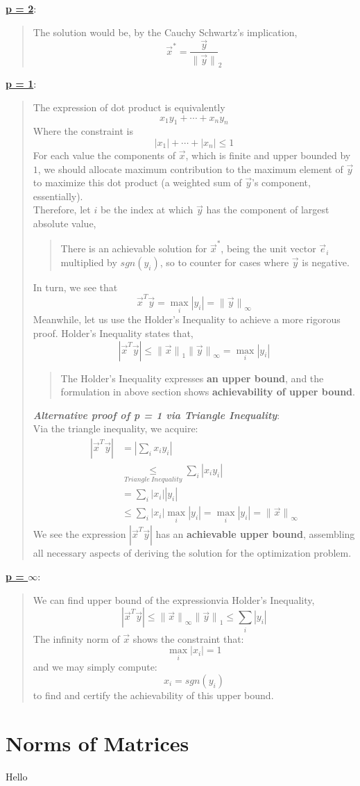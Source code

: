 \underline{\textbf{p = 2}}:
\begin{quote}
    The solution would be, by the Cauchy Schwartz's implication,
    \[\vec{x}^* = \frac{\vec{y}}{\lVert \vec{y} \rVert}_2\]
\end{quote}
\underline{\textbf{p = 1}}:
\begin{quote}
    The expression of dot product is equivalently
    \[x_1 y_1 + \cdots + x_n y_n\]
    Where the constraint is
    \[|x_1| + \cdots + |x_n| \leq 1\]
    For each value the components of $\vec{x}$, which is finite and upper bounded by $1$, we should allocate maximum contribution to the maximum element of $\vec{y}$ to maximize this dot product (a weighted sum of $\vec{y}$'s component, essentially). \\
    Therefore, let $i$ be the index at which $\vec{y}$ has the component of largest absolute value,
    \begin{quote}
        There is an achievable solution for $\vec{x}^*$, being the unit vector $\vec{e}_i$ multiplied by $sgn(y_i)$, so to counter for cases where $\vec{y}$ is negative.
    \end{quote}
    \par
    In turn, we see that
    \[\vec{x}^T \vec{y} = \max_i |y_i| = {\lVert \vec{y} \rVert}_\infty\]
    Meanwhile, let us use the Holder's Inequality to achieve a more rigorous proof. Holder's Inequality states that,
    \[
        |\vec{x}^T \vec{y}| \leq {\lVert \vec{x} \rVert}_1 {\lVert \vec{y} \rVert}_\infty = \max_i |y_i|
    \]
    \begin{quote}
        The Holder's Inequality expresses \textbf{an upper bound}, and the formulation in above section shows \textbf{achievability of upper bound}.
    \end{quote}
    \textbf{\textit{Alternative proof of p = 1 via Triangle Inequality}}: \\
    Via the triangle inequality, we acquire:
    \begin{align*}
        |\vec{x}^T \vec{y}| &= |\sum_i x_i y_i| \\
        &\underset{Triangle\ Inequality}{\leq} \sum_i |x_i y_i| \\
        &= \sum_i |x_i||y_i| \\
        &\leq \sum_i |x_i| \max_i |y_i| = \max_i |y_i| = {\lVert \vec{x} \rVert}_\infty
    \end{align*}
    We see the expression $|\vec{x}^T \vec{y}|$ has an \textbf{achievable upper bound}, assembling all necessary aspects of deriving the solution for the optimization problem.
\end{quote}
\underline{\textbf{p = $\infty$}}:
\begin{quote}
    We can find upper bound of the expressionvia Holder's Inequality,
    \[
        |\vec{x}^T \vec{y}| \leq {\lVert \vec{x} \rVert}_\infty {\lVert \vec{y} \rVert}_1 \leq \sum_i |y_i|
    \]
    The infinity norm of $\vec{x}$ shows the constraint that:
    \[
        \max_i |x_i| = 1
    \]
    and we may simply compute:
    \[
        x_i = sgn(y_i)
    \]
    to find and certify the achievability of this upper bound.
\end{quote}

\section{Norms of Matrices}
Hello
